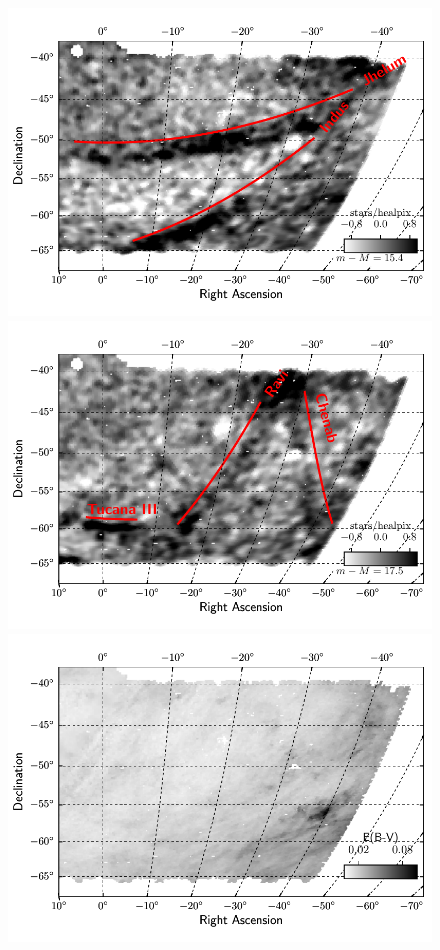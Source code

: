 \documentclass[twocolumn]{aastex61}
\begin{document}
\begin{figure}[]
  \centering
  \includegraphics[width=\columnwidth]{residual_q1_m15p4_v17p2_label}
  \includegraphics[width=\columnwidth]{residual_q1_m17p5_v17p2_label}
  \includegraphics[width=\columnwidth]{sfd_ebv_q1}

\end{figure}
\end{document}
